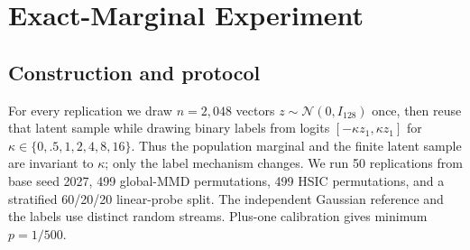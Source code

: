 \section{Exact-Marginal Experiment}
\label{app:synthetic-v9}

\subsection{Construction and protocol}

For every replication we draw $n=2{,}048$ vectors
$z\sim\mathcal N(0,I_{128})$ once, then reuse that latent sample while drawing
binary labels from logits $[-\kappa z_1,\kappa z_1]$ for
$\kappa\in\{0,.5,1,2,4,8,16\}$.  Thus the population marginal and the
finite latent sample are invariant to $\kappa$; only the label mechanism
changes.  We run 50 replications from base seed 2027, 499 global-MMD
permutations, 499 HSIC permutations, and a stratified 60/20/20 linear-probe
split.  The independent Gaussian reference and the labels use distinct random
streams.  Plus-one calibration gives minimum $p=1/500$.

